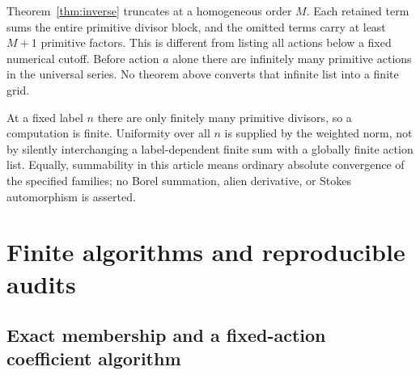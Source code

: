 \documentclass[11pt,a4paper]{article}
\numberwithin{equation}{section}
\theoremstyle{definition}
\theoremstyle{remark}
\begin{document}
Theorem~\ref{thm:inverse} truncates at a homogeneous order $M$. Each
retained term sums the entire primitive divisor block, and the omitted
terms carry at least $M+1$ primitive factors. This is different from
listing all actions below a fixed numerical cutoff. Before action $a$
alone there are infinitely many primitive actions in the universal
series. No theorem above converts that infinite list into a finite grid.

At a fixed label $n$ there are only finitely many primitive divisors,
so a computation is finite. Uniformity over all $n$ is supplied by the
weighted norm, not by silently interchanging a label-dependent finite
sum with a globally finite action list. Equally, summability in this
article means ordinary absolute convergence of the specified families;
no Borel summation, alien derivative, or Stokes automorphism is asserted.

\section{Finite algorithms and reproducible audits}\label{sec:algorithm}

\subsection{Exact membership and a fixed-action coefficient algorithm}
\end{document}
